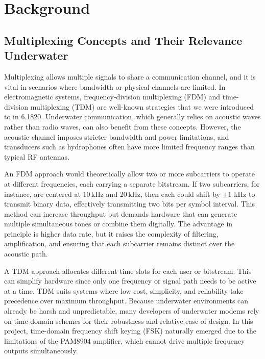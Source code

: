 \chapter{Background}

\section{Multiplexing Concepts and Their Relevance Underwater}

Multiplexing allows multiple signals to share a communication channel, and it is vital in scenarios where bandwidth or physical channels are limited. In electromagnetic systems, frequency-division multiplexing (FDM) and time-division multiplexing (TDM) are well-known strategies that we were introduced to in 6.1820. Underwater communication, which generally relies on acoustic waves rather than radio waves, can also benefit from these concepts. However, the acoustic channel imposes stricter bandwidth and power limitations, and transducers such as hydrophones often have more limited frequency ranges than typical RF antennas.

An FDM approach would theoretically allow two or more subcarriers to operate at different frequencies, each carrying a separate bitstream. If two subcarriers, for instance, are centered at 10\,kHz and 20\,kHz, then each could shift by \(\pm1\) kHz to transmit binary data, effectively transmitting two bits per symbol interval. This method can increase throughput but demands hardware that can generate multiple simultaneous tones or combine them digitally. The advantage in principle is higher data rate, but it raises the complexity of filtering, amplification, and ensuring that each subcarrier remains distinct over the acoustic path.

A TDM approach allocates different time slots for each user or bitstream. This can simplify hardware since only one frequency or signal path needs to be active at a time. TDM suits systems where low cost, simplicity, and reliability take precedence over maximum throughput. Because underwater environments can already be harsh and unpredictable, many developers of underwater modems rely on time-domain schemes for their robustness and relative ease of design. In this project, time-domain frequency shift keying (FSK) naturally emerged due to the limitations of the PAM8904 amplifier, which cannot drive multiple frequency outputs simultaneously.

